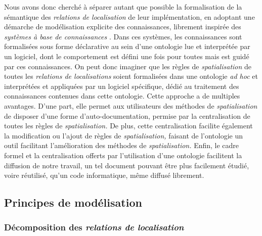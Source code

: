 Nous avons donc cherché à séparer autant que possible la formalisation
de la sémantique des \emph{relations de localisation} de leur
implémentation, en adoptant une démarche de modélisation explicite des
connaissances, librement inspirée des \emph{systèmes à base de
  connaissances} \autocite{LeBer2006}. Dans ces systèmes, les
connaissances sont formalisées sous forme déclarative au sein d'une
ontologie lue et interprétée par un logiciel, dont le comportement est
défini une fois pour toutes mais est guidé par ces connaissances. On
peut donc imaginer que les règles de \emph{spatialisation} de toutes
les \emph{relations de localisations} soient formalisées dans une
ontologie \emph{ad hoc} et interprétées et appliquées par un logiciel
spécifique, dédié au traitement des connaissances contenues dans cette
ontologie. Cette approche a de multiples avantages. D'une part, elle
permet aux utilisateurs des méthodes de \emph{spatialisation} de
disposer d'une forme d'auto-documentation, permise par la
centralisation de toutes les règles de \emph{spatialisation.} De plus,
cette centralisation facilite également la modification ou l'ajout de
règles de \emph{spatialisation,} faisant de l'ontologie un outil
facilitant l'amélioration des méthodes de \emph{spatialisation.}
Enfin, le cadre formel et la centralisation offerts par l’utilisation
d'une ontologie facilitent la diffusion de notre travail, un tel
document pouvant être plus facilement étudié, voire réutilisé, qu'un
code informatique, même diffusé librement.

\subsection{Principes de modélisation}

\subsubsection{Décomposition des \emph{relations de localisation}}
\label{subsec:4-1-2-1}

